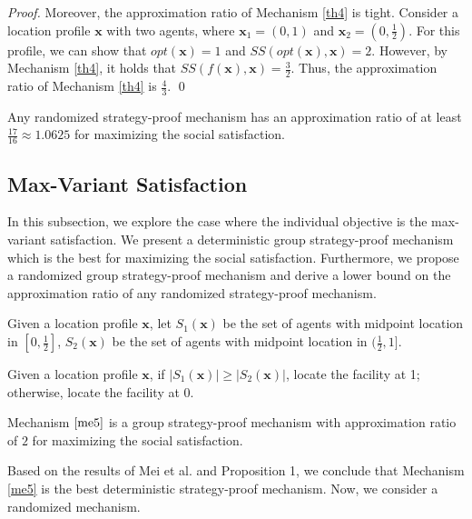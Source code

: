 \documentclass[runningheads]{11llncst}
\begin{document}
\begin{proof}
    Moreover, the approximation ratio of Mechanism \ref{th4} is tight. Consider a location profile $\textbf{x}$ with two agents, where $\textbf{x}_1=(0,1)$ and $\textbf{x}_2=(0,\frac{1}{2})$. For this profile, we can show that $opt(\textbf{x})=1$ and $SS(opt(\textbf{x}),\textbf{x})=2$. However, by Mechanism \ref{th4}, it holds that $SS(f(\textbf{x}),\textbf{x})=\frac{3}{2}$. Thus, the approximation ratio of Mechanism \ref{th4} is $\frac{4}{3}$.
    \qed
\end{proof}


\begin{theorem}
    Any randomized strategy-proof  mechanism has an approximation ratio of at least $\frac{17}{16}\approx1.0625$ for maximizing the social satisfaction.
\end{theorem}


	



\subsection{Max-Variant Satisfaction}

In this subsection, we explore the case where the individual objective is the max-variant satisfaction. We present a deterministic group strategy-proof mechanism which is the best for maximizing the social satisfaction. Furthermore, we propose a randomized group strategy-proof mechanism and derive a lower bound on the approximation ratio of any randomized strategy-proof mechanism. 

Given a location profile $\textbf{x}$, let $S_1(\textbf{x})$ be the set of agents with midpoint location in $[0,\frac{1}{2}]$, $S_2(\textbf{x})$ be the set of agents with midpoint location in $(\frac{1}{2},1]$.

\begin{mechanism}\label{me5}
    Given a location profile $\textbf{x}$, if $|S_1(\textbf{x})| \geq |S_2(\textbf{x})|$, locate the facility at 1; otherwise, locate the facility at $0$.
\end{mechanism}


\begin{theorem}\label{th8}
    Mechanism $\ref{me5}$ is a group strategy-proof mechanism with approximation ratio of $2$ for maximizing the social satisfaction. 
\end{theorem}



   Based on the results of Mei et al. \cite{mei2019facility} and Proposition 1, we conclude that Mechanism \ref{me5} is the best deterministic strategy-proof mechanism.  Now, we consider a randomized mechanism.
\end{document}
